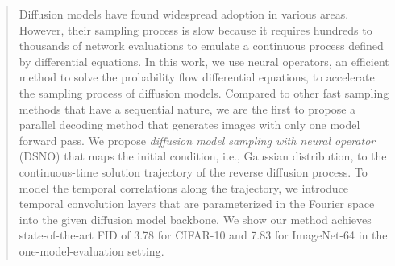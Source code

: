 \begin{abstract}
Diffusion models have found widespread adoption in various areas. However, their sampling process is slow because it requires hundreds to thousands of network evaluations to emulate a continuous process defined by differential equations. In this work, we use neural operators, an efficient method to solve the probability flow differential equations, to accelerate the sampling process of diffusion models. Compared to other fast sampling methods that have a sequential nature, we are the first to propose a parallel decoding method that generates images with only one model forward pass. We propose \textit{diffusion model sampling with neural operator} (DSNO) that maps the initial condition, i.e., Gaussian distribution, to the continuous-time solution trajectory of the reverse diffusion process. To model the temporal correlations along the trajectory, we introduce temporal convolution layers that are parameterized in the Fourier space into the given diffusion model backbone. We show our method achieves state-of-the-art FID of 3.78 for CIFAR-10 and 7.83 for ImageNet-64 in the one-model-evaluation setting. 
\end{abstract}

